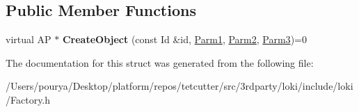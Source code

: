 \subsection*{Public Member Functions}
\begin{DoxyCompactItemize}
\item 
\hypertarget{structLoki_1_1FactoryImpl_3_01AP_00_01Id_00_01LOKI__TYPELIST__3_07P1_00_01P2_00_01P3_08_4_ada78c83710b3e9727a93e773b66cd9a5}{}virtual A\+P $\ast$ {\bfseries Create\+Object} (const Id \&id, \hyperlink{classLoki_1_1EmptyType}{Parm1}, \hyperlink{classLoki_1_1EmptyType}{Parm2}, \hyperlink{classLoki_1_1EmptyType}{Parm3})=0\label{structLoki_1_1FactoryImpl_3_01AP_00_01Id_00_01LOKI__TYPELIST__3_07P1_00_01P2_00_01P3_08_4_ada78c83710b3e9727a93e773b66cd9a5}

\end{DoxyCompactItemize}


The documentation for this struct was generated from the following file\+:\begin{DoxyCompactItemize}
\item 
/\+Users/pourya/\+Desktop/platform/repos/tetcutter/src/3rdparty/loki/include/loki/Factory.\+h\end{DoxyCompactItemize}
